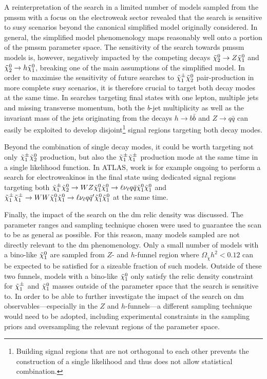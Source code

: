 A reinterpretation of the \onelepton search in a limited number of models sampled from the \gls{pmssm} with a focus on the electroweak sector revealed that the search is sensitive to \gls{susy} scenarios beyond the canonical simplified model originally considered.
In general, the simplified model phenomenology maps reasonably well onto a portion of the \gls{pmssm} parameter space. The sensitivity of the \onelepton search towards \gls{pmssm} models is, however, negatively impacted by the competing decays $\tilde{\chi}_2^0 \rightarrow Z \tilde{\chi}_1^0$ and $\tilde{\chi}_2^0 \rightarrow h \tilde{\chi}_1^0$, breaking one of the main assumptions of the simplified model.
In order to maximise the sensitivity of future searches to $\tilde{\chi}_1^\pm\tilde{\chi}_2^0$ pair-production in more complete \gls{susy} scenarios, it is therefore crucial to target both decay modes at the same time.
In searches targeting final states with one lepton, multiple jets and missing transverse momentum, both the \textit{b}-jet multiplicity as well as the invariant mass of the jets originating from the decays $h\rightarrow b\bar{b}$ and $Z\rightarrow q\bar{q}$ can easily be exploited to develop disjoint\footnote{Building signal regions that are not orthogonal to each other prevents the construction of a single likelihood and thus does not allow statistical combination.} signal regions targeting both decay modes.

Beyond the combination of single decay modes, it could be worth targeting not only $\tilde{\chi}_1^\pm\tilde{\chi}_2^0$ production, but also the $\tilde{\chi}_1^\pm\tilde{\chi}_1^\pm$ production mode at the same time in a single likelihood function. In ATLAS, work is for example ongoing to perform a search for electroweakinos in the \onelepton final state using dedicated signal regions targeting both $\tilde{\chi}_1^\pm\tilde{\chi}_2^0 \rightarrow WZ\tilde{\chi}_1^0\tilde{\chi}_1^0\rightarrow \ell\nu_\ell q\bar{q} \tilde{\chi}_1^0\tilde{\chi}_1^0$ and $\tilde{\chi}_1^\pm\tilde{\chi}_1^\pm \rightarrow WW\tilde{\chi}_1^0\tilde{\chi}_1^0\rightarrow \ell\nu_\ell q\bar{q}' \tilde{\chi}_1^0\tilde{\chi}_1^0$ at the same time. 

Finally, the impact of the \onelepton search on the \gls{dm} relic density was discussed. The parameter ranges and sampling technique chosen were used to guarantee the scan to be as general as possible. For this reason, many models sampled are not directly relevant to the \gls{dm} phenomenology. Only a small number of models with a bino-like $\tilde{\chi}_1^0$ are sampled from $Z$- and $h$-funnel region where $\Omega_{\tilde{\chi}} h^2 < 0.12$ can be expected to be satisfied for a sizeable fraction of such models. Outside of these two funnels, models with a bino-like $\tilde{\chi}_1^0$ only satisfy the relic density constraint for $\tilde{\chi}_1^\pm$ and $\tilde{\chi}_1^0$ masses outside of the parameter space that the \onelepton search is sensitive to. In order to be able to further investigate the impact of the \onelepton search on \gls{dm} observables---especially in the $Z$ and $h$-funnels---a different sampling technique would need to be adopted, including experimental constraints in the sampling priors and oversampling the relevant regions of the parameter space. 



